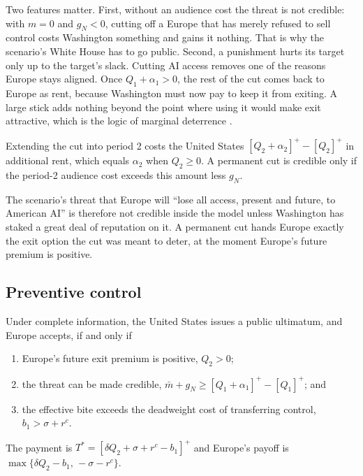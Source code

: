 Two features matter. First, without an audience cost the threat is not credible: with $m=0$ and $g_N<0$, cutting off a Europe that has merely refused to sell control costs Washington something and gains it nothing. That is why the scenario's White House has to go public. Second, a punishment hurts its target only up to the target's slack. Cutting AI access removes one of the reasons Europe stays aligned. Once $Q_1 + \alpha_1>0$, the rest of the cut comes back to Europe as rent, because Washington must now pay to keep it from exiting. A large stick adds nothing beyond the point where using it would make exit attractive, which is the logic of marginal deterrence \citep{stigler1970optimum}.

\begin{lemma}\label{lem:selflimit}
Extending the cut into period 2 costs the United States $[Q_2+\alpha_2]^+ - [Q_2]^+$ in additional rent, which equals $\alpha_2$ when $Q_2 \geq 0$. A permanent cut is credible only if the period-2 audience cost exceeds this amount less $g_N$.
\end{lemma}

The scenario's threat that Europe will ``lose all access, present and future, to American AI'' is therefore not credible inside the model unless Washington has staked a great deal of reputation on it. A permanent cut hands Europe exactly the exit option the cut was meant to deter, at the moment Europe's future premium is positive.

\subsection{Preventive control}

\begin{proposition}\label{prop:control}
Under complete information, the United States issues a public ultimatum, and Europe accepts, if and only if
\begin{enumerate}[label=(\roman*)]
\item Europe's future exit premium is positive, $Q_2>0$;
\item the threat can be made credible, $\bar m + g_N \geq [Q_1+\alpha_1]^+ - [Q_1]^+$; and
\item the effective bite exceeds the deadweight cost of transferring control, $b_1 > \sigma + r^c$.
\end{enumerate}
The payment is $T^* = [\delta Q_2 + \sigma + r^c - b_1]^+$ and Europe's payoff is $\max\{\delta Q_2 - b_1,\, -\sigma - r^c\}$.
\end{proposition}

